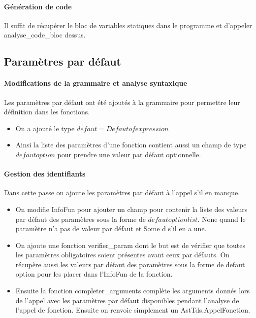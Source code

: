 \documentclass[a4paper,12pt]{article}
\begin{document}
\paragraph{Génération de code} Il suffit de récupérer le bloc de variables statiques dans le programme et d'appeler analyse\_code\_bloc dessus.

\subsection{Paramètres par défaut}
\paragraph{Modifications de la grammaire et analyse syntaxique}
Les paramètres par défaut ont été ajoutés à la grammaire pour permettre leur définition dans les fonctions.
\begin{itemize}
\item On a ajouté le type $defaut = Defaut of expression$
\item Ainsi la liste des paramètres d'une fonction contient aussi un champ de type $defaut option$ pour prendre une valeur par défaut optionnelle.
\end{itemize}

\paragraph{Gestion des identifiants}
Dans cette passe on ajoute les paramètres par défaut à l'appel s'il en manque.

\begin{itemize}
\item On modifie InfoFun pour ajouter un champ pour contenir la liste des valeurs par défaut des paramètres sous la forme de $defaut option list$. None quand le paramètre n'a pas de valeur par défaut et Some d s'il en a une.

\item On ajoute une fonction verifier\_param dont le but est de vérifier que toutes les paramètres obligatoires soient présentes avant ceux par défauts. On récupère aussi les valeurs par défaut des paramètres sous la forme de defaut option pour les placer dans l'InfoFun de la fonction.

\item Ensuite la fonction completer\_arguments complète les arguments donnés lors de l'appel avec les paramètres par défaut disponibles pendant l'analyse de l'appel de fonction. Ensuite on renvoie simplement un AstTds.AppelFonction.

\end{itemize}
\end{document}
